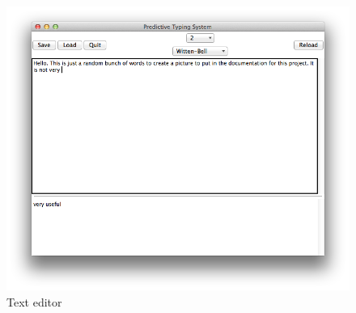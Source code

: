 \documentclass[twoside]{article}
\begin{document}
\begin{figure}[hT!]
        \label{image:editor}
        \includegraphics[width=\textwidth]{editor.png}
        \caption{Text editor}
\end{figure}
\end{document}
